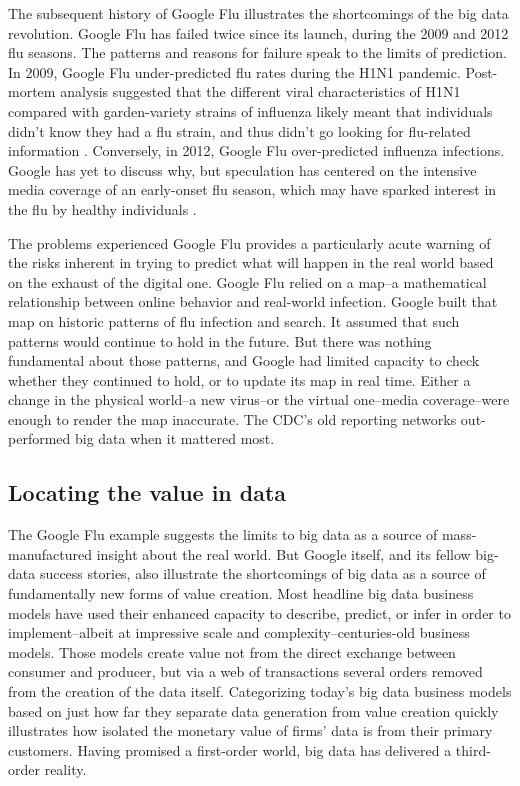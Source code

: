 \documentclass[12pt]{article}
\begin{document}
The subsequent history of Google Flu illustrates the shortcomings of
the big data revolution. Google Flu has failed twice since its launch,
during the 2009 and 2012 flu seasons. The patterns and reasons for
failure speak to the limits of prediction. In 2009, Google Flu
under-predicted flu rates during the H1N1 pandemic. Post-mortem
analysis suggested that the different viral characteristics of H1N1
compared with garden-variety strains of influenza likely meant that
individuals didn't know they had a flu strain, and thus didn't go
looking for flu-related information
\citep{cook2011assessing}. Conversely, in 2012, Google Flu
over-predicted influenza infections. Google has yet to discuss why,
but speculation has centered on the intensive media coverage of an
early-onset flu season, which may have sparked interest in the flu by
healthy individuals \citep{butler2013google}.

The problems experienced Google Flu provides a particularly acute
warning of the risks inherent in trying to predict what will happen in
the real world based on the exhaust of the digital one. Google Flu
relied on a map--a mathematical relationship between online behavior
and real-world infection. Google built that map on historic patterns
of flu infection and search. It assumed that such patterns would
continue to hold in the future. But there was nothing fundamental
about those patterns, and Google had limited capacity to check whether
they continued to hold, or to update its map in real time. Either a change in
the physical world--a new virus--or the virtual one--media
coverage--were enough to render the map inaccurate. The CDC's old
reporting networks out-performed big data when it mattered most.

\subsection{Locating the value in data}
\label{sec:locating-value-data}


The Google Flu example suggests the limits to big data as a source of
mass-manufactured insight about the real world. But Google itself, and
its fellow big-data success stories, also illustrate the shortcomings
of big data as a source of fundamentally new forms of value creation. Most
headline big data business models have used their enhanced capacity to
describe, predict, or infer in order to implement--albeit at
impressive scale and complexity--centuries-old business models. Those
models create value not from the direct exchange between consumer and
producer, but via a web of transactions several orders removed from
the creation of the data itself. Categorizing today's big data
business models based on just how far they separate data generation
from value creation quickly illustrates how isolated the monetary
value of firms' data is from their primary customers. Having promised
a first-order world, big data has delivered a third-order
reality. 
\end{document}
